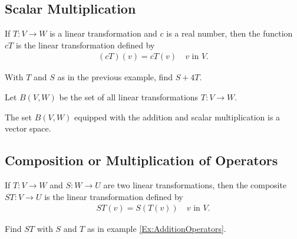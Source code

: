\documentclass[12pt,a4paper]{article}
\newcounter{example}[section]
\begin{document}
	\vfill
	
	\subsection{Scalar Multiplication}
	If $T : V \rightarrow W$ is a linear transformation and $c$ is a real number, then the function $cT$ is the linear transformation defined by
		\begin{align*}
		(cT) (v) = c T(v) \quad v \text{ in } V .
		\end{align*}
		
	\begin{example}
	With $T$ and $S$ as in the previous example, find $S + 4T$.
	\end{example}
	
	\vfill
	
	Let $B (V, W)$ be the set of all linear transformations $T : V \rightarrow W$.
	
	\begin{theorem}
	The set $B(V, W)$ equipped with the addition and scalar multiplication is a vector space.
	\end{theorem}
	
	\newpage
	
	\subsection{Composition or Multiplication of Operators}
	If $T : V \rightarrow W$ and $S : W \rightarrow U$ are two linear transformations, then the composite $ST : V \rightarrow U$ is the linear transformation defined by
		\begin{align*}
		ST (v) = S (T(v)) \quad v \text{ in } V .
		\end{align*}
		
	\begin{example}
	Find $ST$ with $S$ and $T$ as in example \ref{Ex:AdditionOperators}.
	\end{example}	
	
\end{document}

